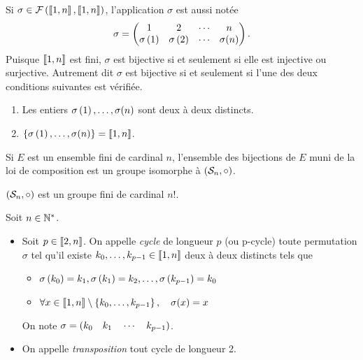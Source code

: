 \documentclass{magnolia}
\begin{document}
\begin{remarques}
\remarque Si $\sigma\in\mathcal{F}\left(\left\llbracket 1,n\right\rrbracket,\left\llbracket 1,n\right\rrbracket\right)$, l'application
  $\sigma$ est aussi notée
  \[\sigma=
    \begin{pmatrix}
    1 & 2 & \cdots & n\\
    \sigma\left(1\right) & \sigma\left(2\right) & \cdots & \sigma(n)
    \end{pmatrix}.\]
  Puisque $\left\llbracket 1,n\right\rrbracket$ est fini, $\sigma$ est bijective si et seulement si
  elle est injective ou surjective. Autrement dit $\sigma$ est bijective si
  et seulement si l'une des deux conditions suivantes est vérifiée.
  \begin{enumerate}
  \item Les entiers $\sigma\left(1\right),\ldots,\sigma(n)$ sont deux à deux distincts.
  \item $\left\{\sigma\left(1\right),\ldots,\sigma(n)\right\}=\left\llbracket 1,n\right\rrbracket$.
  \end{enumerate}
\remarque Si $E$ est un ensemble fini de cardinal $n$, l'ensemble des bijections
  de $E$ muni de la loi de composition est un groupe isomorphe à
  $(\mathcal{S}_{n},\circ)$.
\end{remarques}

\begin{proposition}
$\left(\mathcal{S}_{n},\circ\right)$ est un groupe fini de cardinal $n!$.  
\end{proposition}

\begin{definition}
Soit $n\in{\mathbb{N}^*}$.
\begin{itemize}
\item Soit $p\in\left\llbracket 2,n\right\rrbracket$. On appelle \emph{cycle} de longueur $p$
  (ou p-cycle) toute
  permutation $\sigma$ tel qu'il existe $k_0,\ldots,k_{p-1}\in\left\llbracket 1,n\right\rrbracket$ deux à
  deux distincts tels que
  \begin{itemize}
  \item $\sigma\left(k_0\right)=k_1,\sigma\left(k_1\right)=k_2,\ldots,\sigma\left(k_{p-1}\right)=k_0$
  \item $\forall x\in\left\llbracket 1,n\right\rrbracket\setminus\left\{k_0,\ldots,k_{p-1}\right\} ,\quad
         \sigma(x)=x$
  \end{itemize}
  On note $\sigma=\left(k_0 \quad k_1 \quad \cdots \quad k_{p-1}\right)$.
\item On appelle \emph{transposition} tout cycle de longueur 2.
\end{itemize}
\end{definition}
\end{document}
